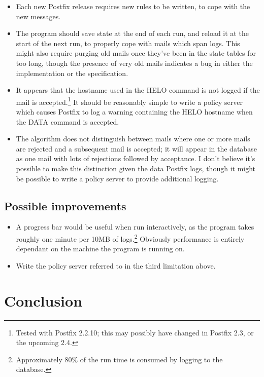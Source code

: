 \documentclass[a4paper,12pt,draft]{article}
\begin{document}
\begin{itemize}

    \item Each new Postfix release requires new rules to be written, to
        cope with the new messages.

    \item The program should save state at the end of each run, and reload
        it at the start of the next run, to properly cope with mails which
        span logs.  This might also require purging old mails once they've
        been in the state tables for too long, though the presence of very
        old mails indicates a bug in either the implementation or the
        specification.

    \item It appears that the hostname used in the HELO command is not
        logged if the mail is accepted.\footnote{Tested with Postfix
        2.2.10; this may possibly have changed in Postfix 2.3, or the
        upcoming 2.4.}  It should be reasonably simple to write a policy
        server which causes Postfix to log a warning containing the HELO
        hostname when the DATA command is accepted.

    \item The algorithm does not distinguish between mails where one or
        more mails are rejected and a subsequent mail is accepted; it will
        appear in the database as one mail with lots of rejections followed
        by acceptance.  I don't believe it's possible to make this
        distinction given the data Postfix logs, though it might be
        possible to write a policy server to provide additional logging.

\end{itemize}

\subsection{Possible improvements}
\begin{itemize}

    \item A progress bar would be useful when run interactively, as the
        program takes roughly one minute per 10MB of
        logs.\footnote{Approximately 80\% of the run time is consumed by
        logging to the database.}  Obviously performance is entirely
        dependant on the machine the program is running on.

    \item Write the policy server referred to in the third limitation
        above.

\end{itemize}

\section{Conclusion}

\appendix
\end{document}
